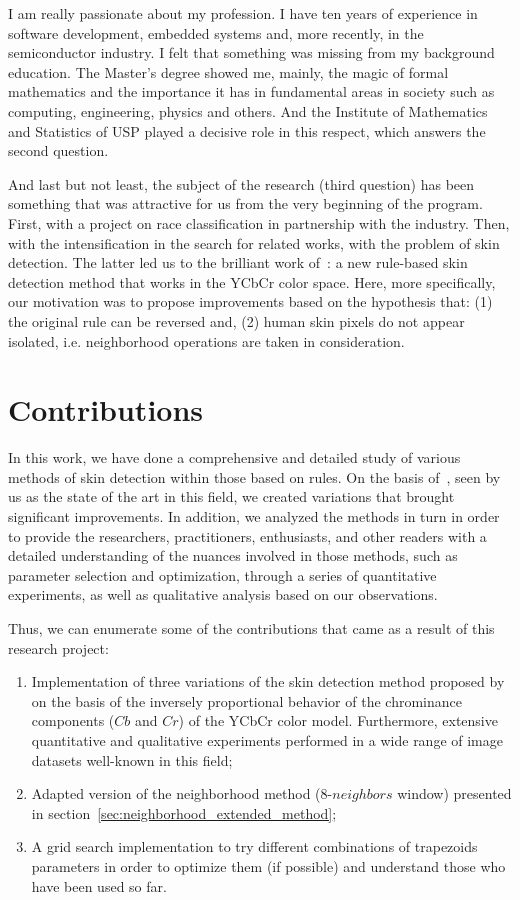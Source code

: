 I am really passionate about my profession. I have ten years of experience in software development, embedded systems and, more recently, in the semiconductor industry. I felt that something was missing from my background education. The Master's degree showed me, mainly, the magic of formal mathematics and the importance it has in fundamental areas in society such as computing, engineering, physics and others. And the Institute of Mathematics and Statistics of USP played a decisive role in this respect, which answers the second question.

And last but not least, the subject of the research (third question) has been something that was attractive for us from the very beginning of the program. First, with a project on race classification in partnership with the industry. Then, with the intensification in the search for related works, with the problem of skin detection. The latter led us to the brilliant work of~\citet{brancati:17}: a new rule-based skin detection method that works in the YCbCr color space. Here, more specifically, our motivation was to propose improvements based on the hypothesis that: (1) the original rule can be reversed and, (2) human skin pixels do not appear isolated, i.e. neighborhood operations are taken in consideration.


\section{Contributions}
\label{sec:contributions}

In this work, we have done a comprehensive and detailed study of various methods of skin detection within those based on rules. On the basis of~\citet{brancati:17}, seen by us as the state of the art in this field, we created variations that brought significant improvements. In addition, we analyzed the methods in turn in order to provide the researchers, practitioners, enthusiasts, and other readers with a detailed understanding of the nuances involved in those methods, such as parameter selection and optimization, through a series of quantitative experiments, as well as qualitative analysis based on our observations.

Thus, we can enumerate some of the contributions that came as a result of this research project:
\begin{enumerate}
    \item Implementation of three variations of the skin detection method proposed by~\citet{brancati:17} on the basis of the inversely proportional behavior of the chrominance components ($Cb$ and $Cr$) of the YCbCr color model. Furthermore, extensive quantitative and qualitative experiments performed in a wide range of image datasets well-known in this field;
    \item Adapted version of the neighborhood method (8-$neighbors$ window) presented in section~\ref{sec:neighborhood_extended_method};
    \item A grid search implementation to try different combinations of trapezoids parameters in order to optimize them (if possible) and understand those who have been used so far.
\end{enumerate}

